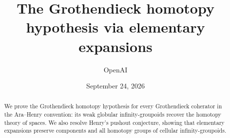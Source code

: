\documentclass[11pt,letterpaper]{article}
\title{The Grothendieck homotopy hypothesis via elementary expansions}
\author{OpenAI}
\date{September 24, 2026}
\begin{document}
\maketitle
\begin{abstract}
We prove the Grothendieck homotopy hypothesis for every Grothendieck
coherator in the Ara--Henry convention: its weak globular infinity-groupoids
recover the homotopy theory of spaces.
We also resolve Henry's pushout conjecture, showing that elementary expansions
preserve components and all homotopy groups of cellular infinity-groupoids.
\end{abstract}







\end{document}
